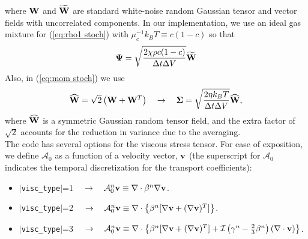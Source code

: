 \documentclass[final]{siamltex}
\def\vb {{\bf v}}
\def\Wb {{\bf W}}
\def\Psib   {\boldsymbol{\Psi}}
\def\Sigmab {\boldsymbol{\Sigma}}
\begin{document}
where $\Wb$ and $\widetilde\Wb$ are standard white-noise random Gaussian tensor
and vector fields with uncorrelated components.  In our implementation, 
we use an ideal gas mixture for (\ref{eq:rho1 stoch}) with $\mu_c^{-1}k_BT \equiv c(1-c)$ so that
\begin{equation}
\Psib = \sqrt{\frac{2\chi\rho c(1-c)}{\Delta t\Delta V}}\widetilde\Wb
\end{equation}
Also, in (\ref{eq:mom stoch}) we use
\begin{equation}
\widehat\Wb = \sqrt{2}\left(\Wb + \Wb^T\right) \quad \rightarrow \quad
\Sigmab = \sqrt{\frac{2\eta k_B T}{\Delta t\Delta V}}\widehat\Wb,
\end{equation}
where $\widehat\Wb$ is a symmetric Gaussian random tensor field, and the
extra factor of $\sqrt{2}$ accounts for the reduction in variance due to the averaging.\\

The code has several options for the viscous stress tensor.  For ease of exposition,
we define $\mathcal{A}_0$ as a function of a velocity vector, $\vb$ (the superscript
for $\mathcal{A}_0$ indicates the temporal discretization for the transport coefficients):\\
\begin{itemize}
\item $|${\tt visc\_type}$|$=1 $\quad\rightarrow\quad \mathcal{A}_0^n\vb \equiv \nabla\cdot\beta^n\nabla\vb$.\\
\item $|${\tt visc\_type}$|$=2 $\quad\rightarrow\quad \mathcal{A}_0^n\vb \equiv \nabla\cdot\left\{\beta^n[\nabla\vb + (\nabla\vb)^T]\right\}$.\\
\item $|${\tt visc\_type}$|$=3 $\quad\rightarrow\quad \mathcal{A}_0^n\vb \equiv \nabla\cdot\left\{\beta^n[\nabla\vb + (\nabla\vb)^T] + \mathcal{I}\left(\gamma^n - \frac{2}{3}\beta^n\right)(\nabla\cdot\vb)\right\}$.\\
\end{itemize}
\end{document}
